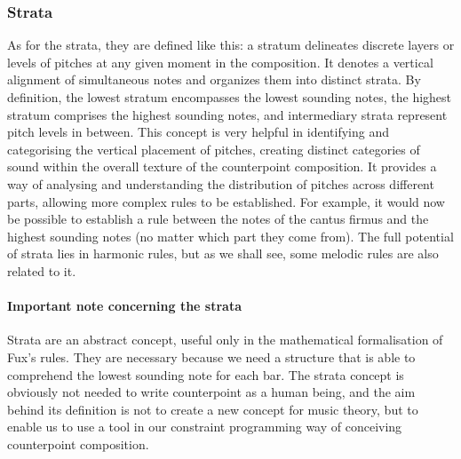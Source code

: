 \subsubsection{Strata}
As for the strata, they are defined like this: a stratum delineates discrete layers or levels of pitches at any given moment in the composition. It denotes a vertical alignment of simultaneous notes and organizes them into distinct strata. By definition, the lowest stratum encompasses the lowest sounding notes, the highest stratum comprises the highest sounding notes, and intermediary strata represent pitch levels in between.
This concept is very helpful in identifying and categorising the vertical placement of pitches, creating distinct categories of sound within the overall texture of the counterpoint composition. It provides a way of analysing and understanding the distribution of pitches across different parts, allowing more complex rules to be established. For example, it would now be possible to establish a rule between the notes of the cantus firmus and the highest sounding notes (no matter which part they come from). The full potential of strata lies in harmonic rules, but as we shall see, some melodic rules are also related to it.

\paragraph*{Important note concerning the strata}
Strata are an abstract concept, useful only in the mathematical formalisation of Fux's rules. They are necessary because we need a structure that is able to comprehend the lowest sounding note for each bar. The strata concept is obviously not needed to write counterpoint as a human being, and the aim behind its definition is not to create a new concept for music theory, but to enable us to use a tool in our constraint programming way of conceiving counterpoint composition.


